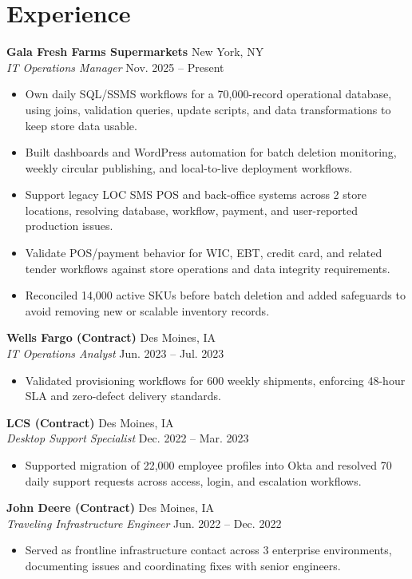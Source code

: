\documentclass[10pt,letterpaper]{article}
\newcommand{\resumeRole}[4]{
  \textbf{#1} \hfill #2\\
  \textit{#3} \hfill #4
}
\begin{document}
\section*{Experience}
\resumeRole{Gala Fresh Farms Supermarkets}{New York, NY}{IT Operations Manager}{Nov. 2025 -- Present}
\begin{itemize}
  \item Own daily SQL/SSMS workflows for a 70,000-record operational database, using joins, validation queries, update scripts, and data transformations to keep store data usable.
  \item Built dashboards and WordPress automation for batch deletion monitoring, weekly circular publishing, and local-to-live deployment workflows.
  \item Support legacy LOC SMS POS and back-office systems across 2 store locations, resolving database, workflow, payment, and user-reported production issues.
  \item Validate POS/payment behavior for WIC, EBT, credit card, and related tender workflows against store operations and data integrity requirements.
  \item Reconciled 14,000 active SKUs before batch deletion and added safeguards to avoid removing new or scalable inventory records.
\end{itemize}

\resumeRole{Wells Fargo (Contract)}{Des Moines, IA}{IT Operations Analyst}{Jun. 2023 -- Jul. 2023}
\begin{itemize}
  \item Validated provisioning workflows for 600 weekly shipments, enforcing 48-hour SLA and zero-defect delivery standards.
\end{itemize}

\resumeRole{LCS (Contract)}{Des Moines, IA}{Desktop Support Specialist}{Dec. 2022 -- Mar. 2023}
\begin{itemize}
  \item Supported migration of 22,000 employee profiles into Okta and resolved 70 daily support requests across access, login, and escalation workflows.
\end{itemize}

\resumeRole{John Deere (Contract)}{Des Moines, IA}{Traveling Infrastructure Engineer}{Jun. 2022 -- Dec. 2022}
\begin{itemize}
  \item Served as frontline infrastructure contact across 3 enterprise environments, documenting issues and coordinating fixes with senior engineers.
\end{itemize}
\end{document}
